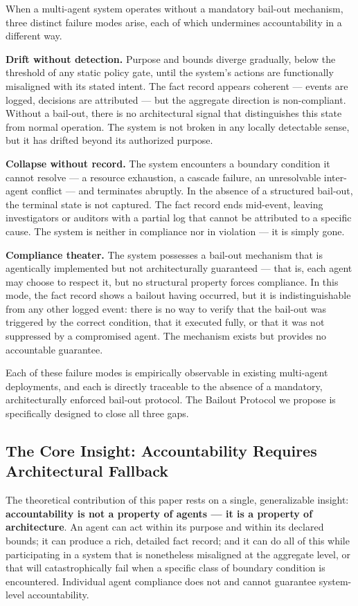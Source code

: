 When a multi-agent system operates without a mandatory bail-out mechanism, three distinct failure modes arise, each of which undermines accountability in a different way.

\textbf{Drift without detection.} Purpose and bounds diverge gradually, below the threshold of any static policy gate, until the system's actions are functionally misaligned with its stated intent. The fact record appears coherent --- events are logged, decisions are attributed --- but the aggregate direction is non-compliant. Without a bail-out, there is no architectural signal that distinguishes this state from normal operation. The system is not broken in any locally detectable sense, but it has drifted beyond its authorized purpose.

\textbf{Collapse without record.} The system encounters a boundary condition it cannot resolve --- a resource exhaustion, a cascade failure, an unresolvable inter-agent conflict --- and terminates abruptly. In the absence of a structured bail-out, the terminal state is not captured. The fact record ends mid-event, leaving investigators or auditors with a partial log that cannot be attributed to a specific cause. The system is neither in compliance nor in violation --- it is simply gone.

\textbf{Compliance theater.} The system possesses a bail-out mechanism that is agentically implemented but not architecturally guaranteed --- that is, each agent may choose to respect it, but no structural property forces compliance. In this mode, the fact record shows a bailout having occurred, but it is indistinguishable from any other logged event: there is no way to verify that the bail-out was triggered by the correct condition, that it executed fully, or that it was not suppressed by a compromised agent. The mechanism exists but provides no accountable guarantee.

Each of these failure modes is empirically observable in existing multi-agent deployments, and each is directly traceable to the absence of a mandatory, architecturally enforced bail-out protocol. The Bailout Protocol we propose is specifically designed to close all three gaps.

\subsection{The Core Insight: Accountability Requires Architectural Fallback}

The theoretical contribution of this paper rests on a single, generalizable insight: \textbf{accountability is not a property of agents --- it is a property of architecture}. An agent can act within its purpose and within its declared bounds; it can produce a rich, detailed fact record; and it can do all of this while participating in a system that is nonetheless misaligned at the aggregate level, or that will catastrophically fail when a specific class of boundary condition is encountered. Individual agent compliance does not and cannot guarantee system-level accountability.

